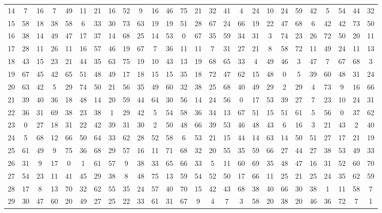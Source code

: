 \begin{table}
\begin{tabular}{c c c c c c c c c c c c c c c c c c c c c c c c c c }
14 & 7 & 16 & 7 & 49 & 11 & 21 & 16 & 52 & 9 & 16 & 46 & 75 & 21 & 32 & 41 & 4 & 24 & 10 & 24 & 59 & 42 & 5 & 54 & 44 & 32 \\
15 & 58 & 18 & 38 & 58 & 6 & 33 & 30 & 73 & 63 & 19 & 19 & 51 & 28 & 67 & 24 & 66 & 19 & 22 & 47 & 68 & 6 & 42 & 42 & 73 & 50 \\
16 & 38 & 14 & 49 & 47 & 17 & 37 & 14 & 68 & 25 & 14 & 53 & 0 & 67 & 35 & 59 & 34 & 31 & 3 & 74 & 23 & 26 & 72 & 50 & 20 & 11 \\
17 & 28 & 11 & 26 & 11 & 16 & 57 & 46 & 19 & 67 & 7 & 36 & 11 & 11 & 7 & 31 & 27 & 21 & 8 & 58 & 72 & 11 & 49 & 24 & 11 & 13 \\
18 & 43 & 15 & 23 & 21 & 44 & 35 & 63 & 75 & 19 & 10 & 43 & 13 & 19 & 68 & 65 & 33 & 4 & 49 & 46 & 3 & 47 & 7 & 67 & 68 & 3 \\
19 & 67 & 45 & 42 & 65 & 51 & 48 & 49 & 17 & 18 & 15 & 15 & 35 & 18 & 72 & 47 & 62 & 15 & 48 & 0 & 5 & 39 & 60 & 48 & 31 & 24 \\
20 & 63 & 42 & 5 & 29 & 74 & 50 & 21 & 56 & 35 & 49 & 60 & 32 & 38 & 25 & 68 & 40 & 49 & 29 & 2 & 29 & 4 & 73 & 9 & 16 & 66 \\
21 & 39 & 40 & 36 & 18 & 48 & 14 & 20 & 59 & 44 & 64 & 30 & 56 & 14 & 24 & 56 & 0 & 17 & 53 & 39 & 27 & 7 & 23 & 10 & 24 & 31 \\
22 & 36 & 31 & 69 & 38 & 23 & 38 & 1 & 29 & 42 & 5 & 54 & 58 & 36 & 34 & 13 & 67 & 51 & 15 & 51 & 61 & 5 & 56 & 0 & 37 & 62 \\
23 & 0 & 27 & 18 & 31 & 22 & 42 & 39 & 31 & 30 & 2 & 50 & 48 & 66 & 39 & 53 & 46 & 48 & 43 & 6 & 16 & 3 & 21 & 43 & 2 & 40 \\
24 & 5 & 68 & 12 & 66 & 50 & 64 & 33 & 62 & 28 & 52 & 58 & 6 & 53 & 21 & 15 & 44 & 14 & 63 & 14 & 50 & 51 & 27 & 17 & 21 & 19 \\
25 & 61 & 49 & 9 & 75 & 36 & 68 & 29 & 57 & 16 & 11 & 71 & 68 & 32 & 20 & 55 & 35 & 59 & 66 & 27 & 44 & 27 & 38 & 53 & 49 & 33 \\
26 & 31 & 9 & 17 & 0 & 1 & 61 & 57 & 9 & 38 & 33 & 65 & 66 & 33 & 5 & 11 & 60 & 69 & 35 & 48 & 47 & 16 & 31 & 52 & 60 & 70 \\
27 & 54 & 23 & 11 & 41 & 45 & 29 & 38 & 8 & 48 & 75 & 13 & 59 & 54 & 52 & 50 & 17 & 66 & 11 & 25 & 21 & 25 & 24 & 35 & 62 & 59 \\
28 & 17 & 8 & 13 & 70 & 32 & 62 & 55 & 35 & 24 & 57 & 40 & 70 & 15 & 42 & 43 & 68 & 38 & 40 & 66 & 30 & 38 & 1 & 11 & 58 & 7 \\
29 & 30 & 47 & 60 & 20 & 49 & 27 & 25 & 22 & 33 & 61 & 31 & 67 & 9 & 4 & 7 & 3 & 58 & 20 & 38 & 20 & 46 & 36 & 72 & 7 & 1 \\

\end{tabular}
\end{table}
